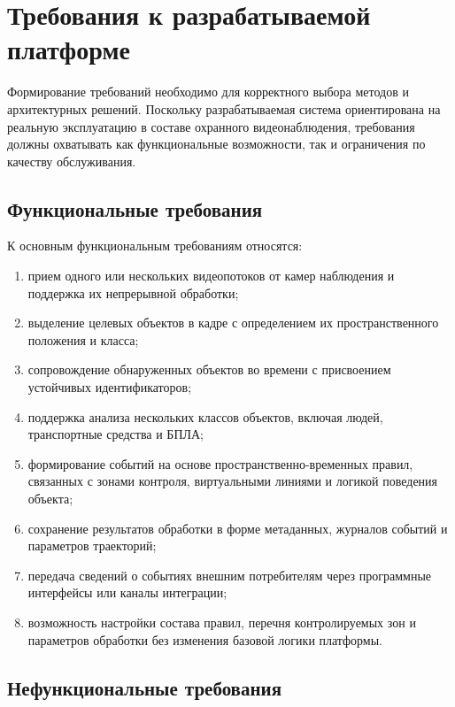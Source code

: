 \section{Требования к разрабатываемой платформе}

Формирование требований необходимо для корректного выбора методов и архитектурных решений. Поскольку разрабатываемая система ориентирована на реальную эксплуатацию в составе охранного видеонаблюдения, требования должны охватывать как функциональные возможности, так и ограничения по качеству обслуживания.

\subsection{Функциональные требования}

К основным функциональным требованиям относятся:
\begin{enumerate}
    \item прием одного или нескольких видеопотоков от камер наблюдения и поддержка их непрерывной обработки;
    \item выделение целевых объектов в кадре с определением их пространственного положения и класса;
    \item сопровождение обнаруженных объектов во времени с присвоением устойчивых идентификаторов;
    \item поддержка анализа нескольких классов объектов, включая людей, транспортные средства и БПЛА;
    \item формирование событий на основе пространственно-временных правил, связанных с зонами контроля, виртуальными линиями и логикой поведения объекта;
    \item сохранение результатов обработки в форме метаданных, журналов событий и параметров траекторий;
    \item передача сведений о событиях внешним потребителям через программные интерфейсы или каналы интеграции;
    \item возможность настройки состава правил, перечня контролируемых зон и параметров обработки без изменения базовой логики платформы.
\end{enumerate}

\subsection{Нефункциональные требования}

